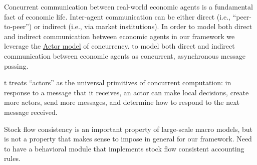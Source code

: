 \documentclass[11pt]{amsart}
\begin{document}
Concurrent communication between real-world economic agents is a fundamental fact of economic life. Inter-agent communication can be either direct (i.e., ``peer-to-peer'') or indirect (i.e., via market institutions). In order to model both direct and indirect communication between economic agents in our framework we leverage the \href{https://en.wikipedia.org/wiki/Actor_model}{Actor model} of concurrency.   to model both direct and indirect communication between economic agents as concurrent, asynchronous message passing.

t treats ``actors'' as the universal primitives of concurrent computation: in response to a message that it receives, an actor can make local decisions, create more actors, send more messages, and determine how to respond to the next message received.

Stock flow consistency is an important property of large-scale macro models, but is not a property that makes sense to impose in general for our framework.  Need to have a behavioral module that implements stock flow consistent accounting rules.



\end{document}
